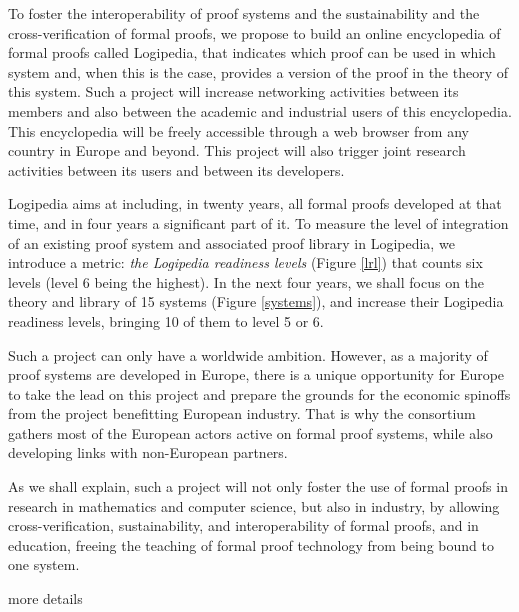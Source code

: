 To foster the interoperability of proof systems and the sustainability
and the cross-verification of formal proofs, we propose to build an
online encyclopedia of formal proofs called {\sc Logipedia}, that
indicates which proof can be used in which system and, when this is the
case, provides a version of the proof in the theory of this system.
Such a project will increase networking activities between its members
and also between the academic and industrial users of this
encyclopedia.  This encyclopedia will be freely accessible through a
web browser from any country in Europe and beyond. This project will
also trigger joint research activities between its users and between
its developers.

{\sc Logipedia} aims at including, in twenty years, all formal proofs developed
at that time, and in four years a significant part of it. To measure the level
of integration of an existing proof system and associated proof library in {\sc
  Logipedia}, we introduce a metric: {\em the {\sc Logipedia} readiness
  levels} (Figure \ref{lrl}) that counts six levels (level 6 being the highest).
In the next four years, we shall focus on the theory and library of 15
systems (Figure \ref{systems}), and increase their {\sc Logipedia} readiness
levels, bringing 10 of them to level 5 or 6.

Such a project can only have a worldwide ambition. However, as a majority of
proof systems are developed in Europe, there is a unique opportunity for Europe
to take the lead on this project and prepare the grounds for the economic
spinoffs from the project benefitting European industry. That is why the
consortium gathers most of the European actors active on formal proof systems,
while also developing links with non-European partners.

As we shall explain, such a project will not only foster the use of
formal proofs in research in mathematics and computer science, but
also in industry, by allowing cross-verification, sustainability, and
interoperability of formal proofs, and in education, freeing the
teaching of formal proof technology from being bound to one system. 

{\color{red} more details}



